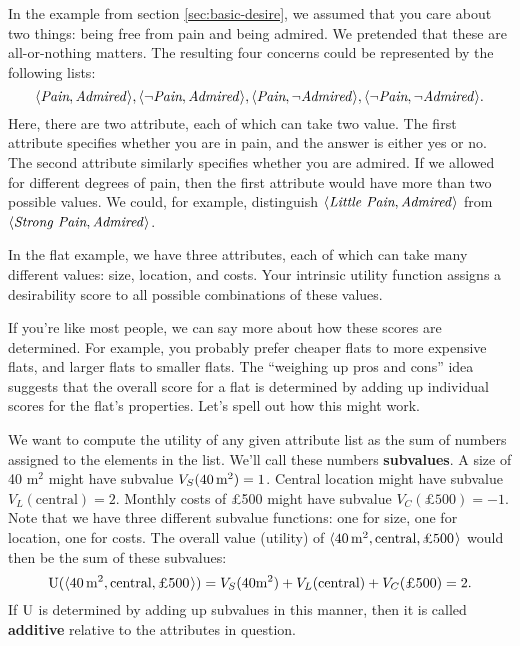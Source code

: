 In the example from section \ref{sec:basic-desire}, we assumed that you care
about two things: being free from pain and being admired. We pretended that
these are all-or-nothing matters. The resulting four concerns could be
represented by the following lists:
\[
  \t{\emph{Pain}, \emph{Admired}}, \t{\neg\emph{Pain}, \emph{Admired}}, \t{\emph{Pain}, \neg\emph{Admired}}, \t{\neg\emph{Pain}, \neg\emph{Admired}}.
\]
Here, there are two attribute, each of which can take two value. The first
attribute specifies whether you are in pain, and the answer is either yes or no.
The second attribute similarly specifies whether you are admired. If we allowed
for different degrees of pain, then the first attribute would have more than two
possible values. We could, for example, distinguish
$\t{\emph{Little Pain}, \emph{Admired}}$ from
$\t{\emph{Strong Pain}, \emph{Admired}}$.


In the flat example, we have three attributes, each of which can take many
different values: size, location, and costs. Your intrinsic utility function
assigns a desirability score to all possible combinations of these values.

If you're like most people, we can say more about how these scores are
determined. For example, you probably prefer cheaper flats to more expensive
flats, and larger flats to smaller flats. The ``weighing up pros and cons'' idea
suggests that the overall score for a flat is determined by adding up individual
scores for the flat's properties. Let's spell out how this might work.

We want to compute the utility of any given attribute list as the sum of numbers
assigned to the elements in the list. We'll call these numbers
\textbf{subvalues}. A size of 40 m$^{2}$ might have subvalue
$V_{S}(40\, \text{m}^2) = 1$. Central location might have subvalue
$V_{L}(\text{central}) = 2$. Monthly costs of £500 might have subvalue
$V_{C}(\text{£500}) = -1$. Note that we have three different subvalue functions:
one for size, one for location, one for costs. The overall value (utility) of
$\t{40\, \m^2, \text{central}, \text{£500}}$ would then be the sum of these
subvalues:
\[
\U(\t{40\, \m^2, \text{central}, \text{£500}}) = V_{S}(40 \m^2) +
V_{L}(\text{central}) + V_{C}(\text{£500}) = 2.
\]
%
If $\text{U}$ is determined by adding up subvalues in this manner, then it is called
\textbf{additive} relative to the attributes in question.


